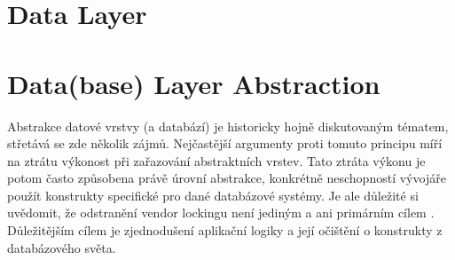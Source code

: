



\section{Data Layer}

\section{Data(base) Layer Abstraction}
Abstrakce datové vrstvy (a databází) je historicky hojně diskutovaným tématem, %
střetává se zde několik zájmů. Nejčastější argumenty proti tomuto principu míří na 
ztrátu výkonost při zařazování abstraktních vrstev. Tato ztráta výkonu je potom často způsobena 
právě úrovní abstrakce, konkrétně neschopností vývojáře použít konstrukty specifické pro dané databázové systémy. 
Je ale důležité si uvědomit, že odstranění vendor lockingu není jediným a ani primárním cílem .
Důležitějším cílem je zjednodušení aplikační logiky a její očištění o konstrukty z databázového světa. 

